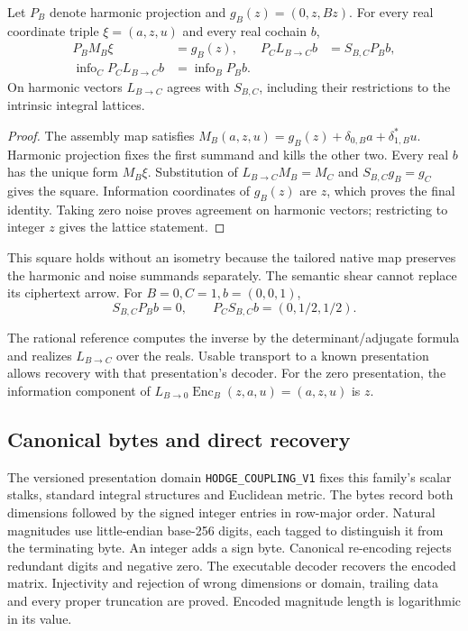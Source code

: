 \begin{proposition}
\label{prop:coupled-recovery-square}
Let \(P_B\) denote harmonic projection and
\(g_B(z)=(0,z,Bz)\). For every real coordinate triple \(\xi=(a,z,u)\) and
every real cochain \(b\),
\begin{align*}
 P_B M_B\xi&=g_B(z),&
 P_C L_{B\to C}b&=S_{B,C}P_Bb,\\
 \operatorname{info}_C P_C L_{B\to C}b&=\operatorname{info}_B P_Bb.
\end{align*}
On harmonic vectors \(L_{B\to C}\) agrees with \(S_{B,C}\), including
their restrictions to the intrinsic integral lattices.
\end{proposition}

\begin{proof}
The assembly map satisfies
\(M_B(a,z,u)=g_B(z)+\delta_{0,B}a+\delta_{1,B}^*u\).
Harmonic projection fixes the first summand and kills the other two.
Every real \(b\) has the unique form \(M_B\xi\). Substitution of
\(L_{B\to C}M_B=M_C\) and \(S_{B,C}g_B=g_C\) gives the square.
Information coordinates of \(g_B(z)\) are \(z\), which proves the final
identity. Taking zero noise proves agreement on harmonic vectors; restricting
to integer \(z\) gives the lattice statement.
\end{proof}



This square holds without an isometry because the tailored native map
preserves the harmonic and noise summands separately. The semantic shear
cannot replace its ciphertext arrow. For \(B=0,C=1,b=(0,0,1)\),
\[
 S_{B,C}P_Bb=0,\qquad P_CS_{B,C}b=(0,1/2,1/2).
\]

The rational reference computes the inverse by the determinant/adjugate
formula and realizes \(L_{B\to C}\) over the reals. Usable transport to a
known presentation allows recovery with that presentation's decoder. For
the zero presentation, the information component of
\(L_{B\to0}\operatorname{Enc}_B(z,a,u)=(a,z,u)\) is \(z\).

\subsection{Canonical bytes and direct recovery}

The versioned presentation domain \texttt{HODGE\_COUPLING\_V1} fixes this
family's scalar stalks, standard integral structures and Euclidean metric.
The bytes record both dimensions followed by the signed integer entries in
row-major order. Natural magnitudes use little-endian base-256 digits, each
tagged to distinguish it from the terminating byte. An integer adds a sign
byte. Canonical re-encoding rejects redundant digits and negative zero.
The executable decoder recovers the encoded matrix. Injectivity and rejection
of wrong dimensions or domain, trailing data and every proper truncation are
proved. Encoded magnitude length is logarithmic in its value.

